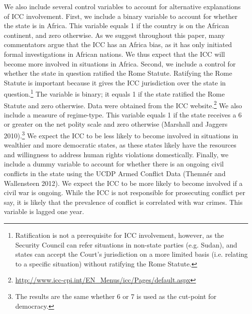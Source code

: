 We also include several control variables to account for alternative explanations of ICC involvement. First, we include a binary variable to account for whether the state is in Africa. This variable equals 1 if the country is on the African continent, and zero otherwise. As we suggest throughout this paper, many commentators argue that the ICC has an Africa bias, as it has only initiated formal investigations in African nations. We thus expect that the ICC will become more involved in situations in Africa.  Second, we include a control for whether the state in question ratified the Rome Statute. Ratifying the Rome Statute is important because it gives the ICC jurisdiction over the state in question.\footnote{Ratification is not a prerequisite for ICC involvement, however, as the Security Council can refer situations in non-state parties (e.g. Sudan), and states can accept the Court’s jurisdiction on a more limited basis (i.e. relating to a specific situation) without ratifying the Rome Statute.}  The variable is binary; it equals 1 if the state ratified the Rome Statute and zero otherwise. Data were obtained from the ICC website.\footnote{\url{http://www.icc-cpi.int/EN_Menus/icc/Pages/default.aspx}} We also include a measure of regime-type. This variable equals 1 if the state receives a 6 or greater on the net polity scale and zero otherwise (Marshall and Jaggers 2010).\footnote{The results are the same whether 6 or 7 is used as the cut-point for democracy.}   We expect the ICC to be less likely to become involved in situations in wealthier and more democratic states, as these states likely have the resources and willingness to address human rights violations domestically. Finally, we include a dummy variable to account for whether there is an ongoing civil conflicts in the state using the UCDP Armed Conflict Data (Themnér and Wallensteen 2012). We expect the ICC to be more likely to become involved if a civil war is ongoing. While the ICC is not responsible for prosecuting conflict per say, it is likely that the prevalence of conflict is correlated with war crimes.  This variable is lagged one year.   

